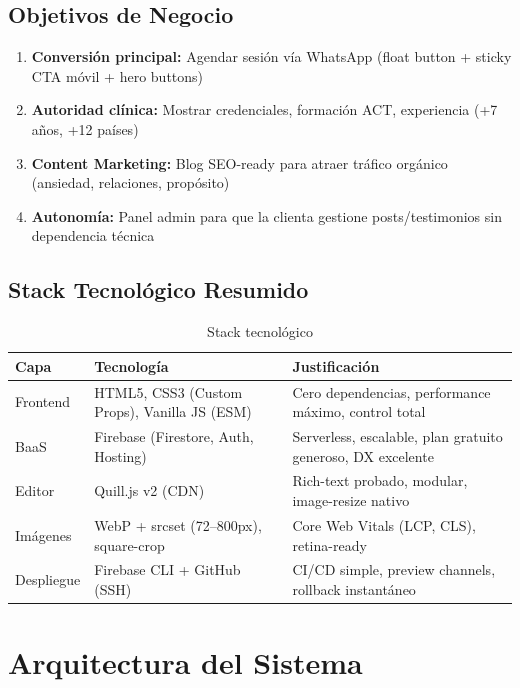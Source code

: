 \documentclass[12pt,a4paper,spanish]{report}
\begin{document}
\section{Objetivos de Negocio}
\begin{enumerate}
    \item \textbf{Conversión principal:} Agendar sesión vía WhatsApp (float button + sticky CTA móvil + hero buttons)
    \item \textbf{Autoridad clínica:} Mostrar credenciales, formación ACT, experiencia (+7 años, +12 países)
    \item \textbf{Content Marketing:} Blog SEO-ready para atraer tráfico orgánico (ansiedad, relaciones, propósito)
    \item \textbf{Autonomía:} Panel admin para que la clienta gestione posts/testimonios sin dependencia técnica
\end{enumerate}

\section{Stack Tecnológico Resumido}
\begin{table}[H]
    \centering
    \caption{Stack tecnológico}
    \label{tab:stack}
    \begin{tabular}{lll}
        \toprule
        \textbf{Capa} & \textbf{Tecnología} & \textbf{Justificación} \\
        \midrule
        Frontend & HTML5, CSS3 (Custom Props), Vanilla JS (ESM) & Cero dependencias, performance máximo, control total \\
        BaaS & Firebase (Firestore, Auth, Hosting) & Serverless, escalable, plan gratuito generoso, DX excelente \\
        Editor & Quill.js v2 (CDN) & Rich-text probado, modular, image-resize nativo \\
        Imágenes & WebP + srcset (72--800px), square-crop & Core Web Vitals (LCP, CLS), retina-ready \\
        Despliegue & Firebase CLI + GitHub (SSH) & CI/CD simple, preview channels, rollback instantáneo \\
    \bottomrule
    \end{tabular}
\end{table}

\chapter{Arquitectura del Sistema}
\label{ch:arquitectura}
\end{document}
